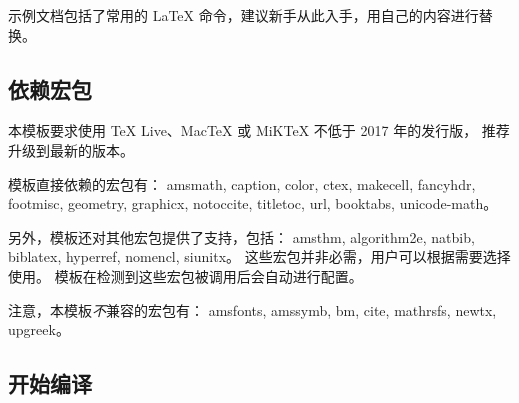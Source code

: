 \documentclass[a4paper]{ltxdoc}
\DeclareRobustCommand\pkg{\textsf}
\begin{document}
示例文档包括了常用的 \LaTeX{} 命令，建议新手从此入手，用自己的内容进行替换。


\subsection{依赖宏包}

本模板要求使用 TeX Live、MacTeX 或 MiKTeX 不低于 2017 年的发行版，
推荐升级到最新的版本。

模板直接依赖的宏包有：
\pkg{amsmath},
\pkg{caption},
\pkg{color},
\pkg{ctex},
\pkg{makecell},
\pkg{fancyhdr},
\pkg{footmisc},
\pkg{geometry},
\pkg{graphicx},
\pkg{notoccite},
\pkg{titletoc},
\pkg{url},
\pkg{booktabs},
\pkg{unicode-math}。

另外，模板还对其他宏包提供了支持，包括：
\pkg{amsthm},
\pkg{algorithm2e},
\pkg{natbib},
\pkg{biblatex},
\pkg{hyperref},
\pkg{nomencl},
\pkg{siunitx}。
这些宏包并非必需，用户可以根据需要选择使用。
模板在检测到这些宏包被调用后会自动进行配置。

注意，本模板\emph{不}兼容的宏包有：
\pkg{amsfonts},
\pkg{amssymb},
\pkg{bm},
\pkg{cite},
\pkg{mathrsfs},
\pkg{newtx},
\pkg{upgreek}。


\subsection{开始编译}
\end{document}
